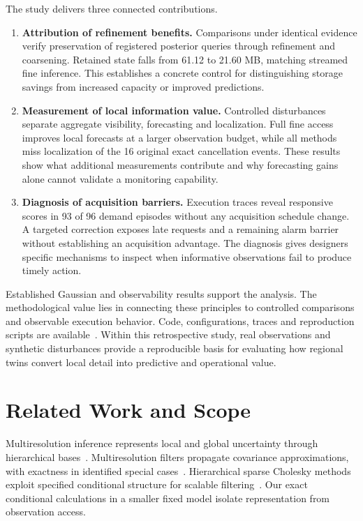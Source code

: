 \documentclass[conference]{IEEEtran}
\begin{document}
The study delivers three connected contributions.
\begin{enumerate}
\item \textbf{Attribution of refinement benefits.} Comparisons under identical evidence verify preservation of registered posterior queries through refinement and coarsening. Retained state falls from 61.12 to 21.60 MB, matching streamed fine inference. This establishes a concrete control for distinguishing storage savings from increased capacity or improved predictions.
\item \textbf{Measurement of local information value.} Controlled disturbances separate aggregate visibility, forecasting and localization. Full fine access improves local forecasts at a larger observation budget, while all methods miss localization of the 16 original exact cancellation events. These results show what additional measurements contribute and why forecasting gains alone cannot validate a monitoring capability.
\item \textbf{Diagnosis of acquisition barriers.} Execution traces reveal responsive scores in 93 of 96 demand episodes without any acquisition schedule change. A targeted correction exposes late requests and a remaining alarm barrier without establishing an acquisition advantage. The diagnosis gives designers specific mechanisms to inspect when informative observations fail to produce timely action.
\end{enumerate}

Established Gaussian and observability results support the analysis. The methodological value lies in connecting these principles to controlled comparisons and observable execution behavior. Code, configurations, traces and reproduction scripts are available~\cite{artifact}. Within this retrospective study, real observations and synthetic disturbances provide a reproducible basis for evaluating how regional twins convert local detail into predictive and operational value.



\section{Related Work and Scope}
Multiresolution inference represents local and global uncertainty through hierarchical bases~\cite{katzfuss2017}. Multiresolution filters propagate covariance approximations, with exactness in identified special cases~\cite{mrf}. Hierarchical sparse Cholesky methods exploit specified conditional structure for scalable filtering~\cite{vecchia}. Our exact conditional calculations in a smaller fixed model isolate representation from observation access.
\end{document}
